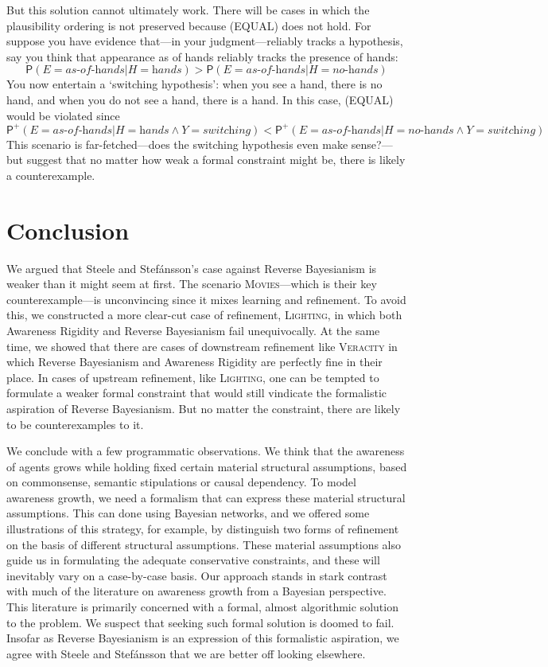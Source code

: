 \documentclass[
  11pt,
  dvipsnames,enabledeprecatedfontcommands]{scrartcl}
\newcommand{\pr}[1]{\ensuremath{\mathsf{P}(#1)}}
\newcommand{\ppr}[2]{\ensuremath{\mathsf{P}^{#1}(#2)}}
\begin{document}
But this solution cannot ultimately work. There will be cases in which
the plausibility ordering is not preserved because (EQUAL) does not
hold. For suppose you have evidence that---in your judgment---reliably
tracks a hypothesis, say you think that appearance as of hands reliably
tracks the presence of hands:
\[\pr{E=\textit{as-of-hands} \vert H=\textit{hands}} > \pr{E=\textit{as-of-hands} \vert H=\textit{no-hands}} \]
You now entertain a `switching hypothesis': when you see a hand, there
is no hand, and when you do not see a hand, there is a hand. In this
case, (EQUAL) would be violated since
\[\ppr{+}{E=\textit{as-of-hands} \vert H=\textit{hands} \wedge Y=\textit{switching}} < \ppr{+}{E=\textit{as-of-hands} \vert H=\textit{no-hands} \wedge Y=\textit{switching}}\]
This scenario is far-fetched---does the switching hypothesis even make
sense?---but suggest that no matter how weak a formal constraint might
be, there is likely a counterexample.

\hypertarget{conclusion}{%
\section{Conclusion}\label{conclusion}}

We argued that Steele and Stefánsson's case against Reverse Bayesianism
is weaker than it might seem at first. The scenario
\textsc{Movies}---which is their key counterexample---is unconvincing
since it mixes learning and refinement. To avoid this, we constructed a
more clear-cut case of refinement, \textsc{Lighting}, in which both
Awareness Rigidity and Reverse Bayesianism fail unequivocally. At the
same time, we showed that there are cases of downstream refinement like
\textsc{Veracity} in which Reverse Bayesianism and Awareness Rigidity
are perfectly fine in their place. In cases of upstream refinement, like
\textsc{Lighting}, one can be tempted to formulate a weaker formal
constraint that would still vindicate the formalistic aspiration of
Reverse Bayesianism. But no matter the constraint, there are likely to
be counterexamples to it.

We conclude with a few programmatic observations. We think that the
awareness of agents grows while holding fixed certain material
structural assumptions, based on commonsense, semantic stipulations or
causal dependency. To model awareness growth, we need a formalism that
can express these material structural assumptions. This can done using
Bayesian networks, and we offered some illustrations of this strategy,
for example, by distinguish two forms of refinement on the basis of
different structural assumptions. These material assumptions also guide
us in formulating the adequate conservative constraints, and these will
inevitably vary on a case-by-case basis. Our approach stands in stark
contrast with much of the literature on awareness growth from a Bayesian
perspective. This literature is primarily concerned with a formal,
almost algorithmic solution to the problem. We suspect that seeking such
formal solution is doomed to fail. Insofar as Reverse Bayesianism is an
expression of this formalistic aspiration, we agree with Steele and
Stefánsson that we are better off looking elsewhere.
\end{document}
